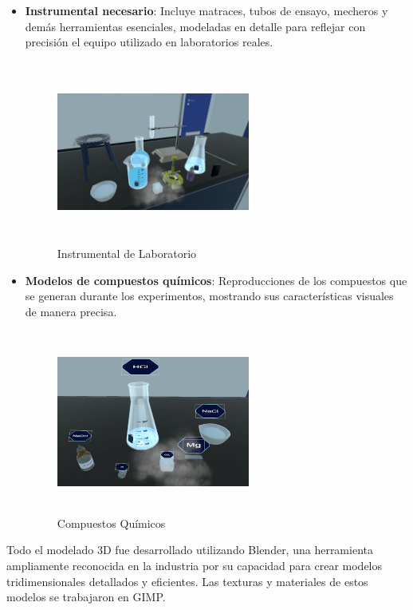 \begin{itemize}
    \item \textbf{Instrumental necesario}: Incluye matraces, tubos de ensayo, mecheros y demás herramientas esenciales, modeladas en detalle para reflejar con precisión el equipo utilizado en laboratorios reales.
    \begin{figure}[thbp]
        \centering
        \includegraphics[width=0.6\textwidth, height = 6cm]{img/chapter04/Instrumental.png}
        \caption{Instrumental de Laboratorio}
        \label{fig:Instrumental_De_Laboratorio}
    \end{figure}
    \newpage
    \item \textbf{Modelos de compuestos químicos}: Reproducciones de los compuestos que se generan durante los experimentos, mostrando sus características visuales de manera precisa.
    \begin{figure}[thbp]
        \centering
        \includegraphics[width=0.6\textwidth, height = 6cm]{img/chapter04/Compuestos.png}
        \caption{Compuestos Químicos}
        \label{fig:Compuestos_Químicos}
    \end{figure}
\end{itemize}

Todo el modelado 3D fue desarrollado utilizando Blender, una herramienta ampliamente reconocida en la industria por su capacidad para crear modelos tridimensionales detallados y eficientes. Las texturas y materiales de estos modelos se trabajaron en GIMP.

